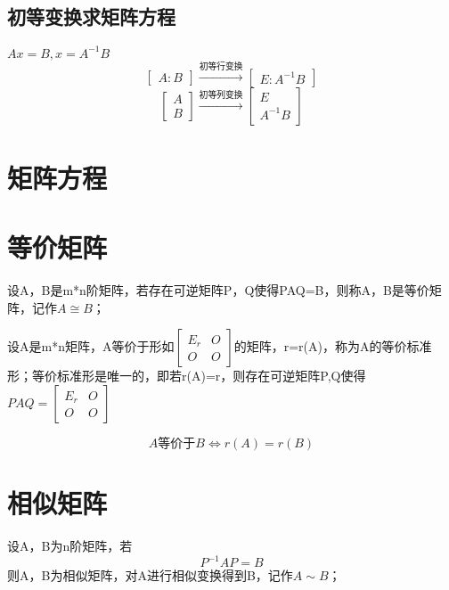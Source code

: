 \subsection{初等变换求矩阵方程}
\(Ax = B, x = A^{-1}B\)
\[
\begin{bmatrix}
A:B
\end{bmatrix}
\xrightarrow{\text{初等行变换}}
\begin{bmatrix}
E:A^{-1}B
\end{bmatrix}
\]
\[
\begin{bmatrix}
A \\ 
B
\end{bmatrix}
\xrightarrow{\text{初等列变换}}
\begin{bmatrix}
E \\ 
A^{-1}B
\end{bmatrix}
\]



\section{矩阵方程}


\section{等价矩阵}

设A，B是m*n阶矩阵，若存在可逆矩阵P，Q使得PAQ=B，则称A，B是等价矩阵，记作\(A \cong B\)；

设A是m*n矩阵，A等价于形如\(
\begin{bmatrix}
E_r & O \\ 
O & O
\end{bmatrix}
\)的矩阵，r=r(A)，称为A的等价标准形；等价标准形是唯一的，即若r(A)=r，则存在可逆矩阵P,Q使得\(PAQ = 
\begin{bmatrix}
E_r & O \\ 
O & O
\end{bmatrix}\)

\[A \text{等价于} B \Leftrightarrow r(A) = r(B)\]
\mymatrix


\section{相似矩阵}

设A，B为n阶矩阵，若
\[P^{-1}AP = B\]
则A，B为相似矩阵，对A进行相似变换得到B，记作\(A \sim B\)；

